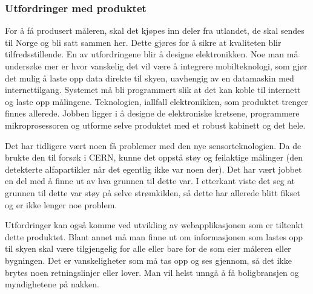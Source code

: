 \subsubsection{Utfordringer med produktet}

For å få produsert måleren, skal det kjøpes inn deler fra utlandet, de skal sendes til Norge og bli satt sammen her. Dette gjøres for å sikre at kvaliteten blir tilfredsstillende. En av utfordringene blir å designe elektronikken. Noe man må undersøke mer er hvor vanskelig det vil være å integrere mobilteknologi, som gjør det mulig å laste opp data direkte til skyen, uavhengig av en datamaskin med internettilgang. Systemet må bli programmert slik at det kan koble til internett og laste opp målingene. Teknologien, iallfall elektronikken, som produktet trenger finnes allerede. Jobben ligger i å designe de elektroniske kretsene, programmere mikroprosessoren og utforme selve produktet med et robust kabinett og det hele.

Det har tidligere vært noen få problemer med den nye sensorteknologien. Da de brukte den til forsøk i CERN, kunne det oppstå støy og feilaktige målinger (den detekterte alfapartikler når det egentlig ikke var noen der). Det har vært jobbet en del med å finne ut av hva grunnen til dette var. I etterkant viste det seg at grunnen til dette var støy på selve strømkilden, så dette har allerede blitt fikset og er ikke lenger noe problem.

Utfordringer kan også komme ved utvikling av webapplikasjonen som er tiltenkt dette produktet. Blant annet må man finne ut om informasjonen som lastes opp til skyen skal være tilgjengelig for alle eller bare for de som eier måleren eller bygningen. Det er vanskeligheter som må tas opp og ses gjennom, så det ikke brytes noen retningslinjer eller lover. Man vil helst unngå å få boligbransjen og myndighetene på nakken.
